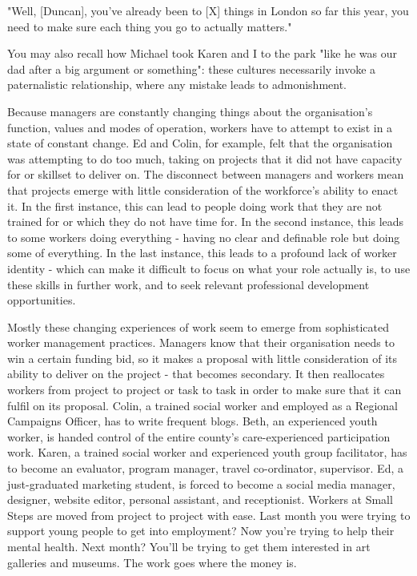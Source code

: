 "Well, [Duncan], you've already been to [X] things in London so far this year, you need to make sure each thing you go to actually matters."

You may also recall how Michael took Karen and I to the park "like he was our dad after a big argument or something": these cultures necessarily invoke a paternalistic relationship, where any mistake leads to admonishment.

Because managers are constantly changing things about the organisation's function, values and modes of operation, workers have to attempt to exist in a state of constant change. Ed and Colin, for example, felt that the organisation was attempting to do too much, taking on projects that it did not have capacity for or skillset to deliver on. The disconnect between managers and workers mean that projects emerge with little consideration of the workforce's ability to enact it. In the first instance, this can lead to people doing work that they are not trained for or which they do not have time for. In the second instance, this leads to some workers doing everything - having no clear and definable role but doing some of everything. In the last instance, this leads to a profound lack of worker identity - which can make it difficult to focus on what your role actually is, to use these skills in further work, and to seek relevant professional development opportunities.

Mostly these changing experiences of work seem to emerge from sophisticated worker management practices. Managers know that their organisation needs to win a certain funding bid, so it makes a proposal with little consideration of its ability to deliver on the project - that becomes secondary. It then reallocates workers from project to project or task to task in order to make sure that it can fulfil on its proposal. Colin, a trained social worker and employed as a Regional Campaigns Officer, has to write frequent blogs. Beth, an experienced youth worker, is handed control of the entire county's care-experienced participation work. Karen, a trained social worker and experienced youth group facilitator, has to become an evaluator, program manager, travel co-ordinator, supervisor. Ed, a just-graduated marketing student, is forced to become a social media manager, designer, website editor, personal assistant, and receptionist. Workers at Small Steps are moved from project to project with ease. Last month you were trying to support young people to get into employment? Now you're trying to help their mental health. Next month? You'll be trying to get them interested in art galleries and museums. The work goes where the money is.

